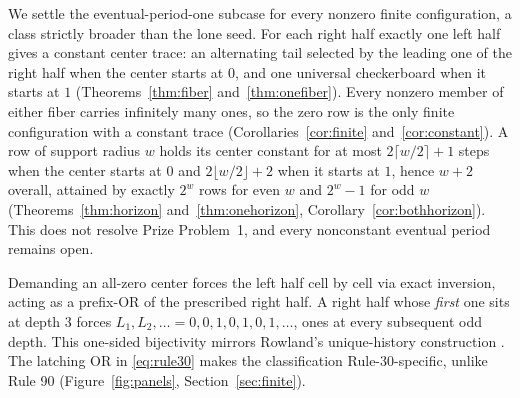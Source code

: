 \documentclass[11pt]{article}
\begin{document}
We settle the eventual-period-one subcase for every nonzero finite
configuration, a class strictly broader than the lone seed.  For each right half
exactly one left half gives a constant center trace: an alternating tail
selected by the leading one of the right half when the center starts at $0$, and
one universal checkerboard when it starts at $1$
(Theorems~\ref{thm:fiber} and~\ref{thm:onefiber}).  Every nonzero member of
either fiber carries infinitely many ones, so the zero row is the only finite
configuration with a constant trace (Corollaries~\ref{cor:finite}
and~\ref{cor:constant}).  A row of support radius $w$ holds its center constant
for at most $2\lceil w/2\rceil+1$ steps when the center starts at $0$ and
$2\lfloor w/2\rfloor+2$ when it starts at $1$, hence $w+2$ overall, attained by
exactly $2^w$ rows for even $w$ and $2^w-1$ for odd $w$
(Theorems~\ref{thm:horizon} and~\ref{thm:onehorizon},
Corollary~\ref{cor:bothhorizon}).  This does not resolve Prize Problem~1, and
every nonconstant eventual period remains open.

Demanding an all-zero center forces the left half cell by cell via exact
inversion, acting as a prefix-OR of the prescribed right half.  A right half
whose \emph{first} one sits at depth $3$ forces
$L_1,L_2,\ldots=0,0,1,0,1,0,1,\ldots$, ones at every subsequent odd depth.  This
one-sided bijectivity mirrors Rowland's unique-history construction
\cite[Prop.~1]{rowland}.  The latching OR in \eqref{eq:rule30} makes the
classification Rule-30-specific, unlike Rule 90
(Figure~\ref{fig:panels}, Section~\ref{sec:finite}).
\end{document}
